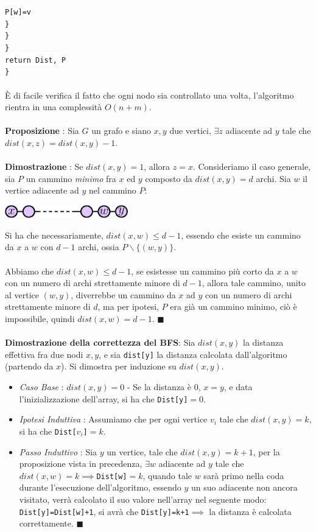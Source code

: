 \documentclass[12pt, letterpaper]{article}
\newcommand{\codee}[1]{\colorbox{white}{\texttt{#1}}}
\newcommand{\acc}{\\\hphantom{}\\}
\begin{document}
\hphantom{ident}\hphantom{ident}\hphantom{ident}\hphantom{ident}\codee{P[w]=v}\\
\hphantom{ident}\hphantom{ident}\hphantom{ident}\codee{\}}\\
\hphantom{ident}\hphantom{ident}\codee{\}}\\
\hphantom{ident}\codee{\}}\\
\hphantom{ident}\codee{return Dist, P}\\
\codee{\}}\acc
È di facile verifica il fatto che ogni nodo sia controllato una volta, l'algoritmo rientra in una complessità $O(n+m)$.\acc 
\textbf{Proposizione }: Sia $G$ un grafo e siano $x,y$ due vertici, $\exists z $ adiacente ad $y$ tale che
 $dist(x,z)=dist(x,y)-1$.\acc
 \textbf{Dimostrazione }: Se $dist(x,y)=1$, allora $z=x$. Consideriamo il caso generale, sia $P$ un cammino 
 \textit{minimo} fra $x$ ed $y$ composto da $dist(x,y)=d$ archi. Sia $w$ il vertice adiacente ad $y$ nel cammino $P$:
 \begin{center}
\includegraphics[width=0.4\textwidth ]{images/xvy.eps}
\end{center} 
Si ha che necessariamente, $dist(x,w)\le d-1$, essendo che esiste un cammino da $x$ a $w$ con $d-1$ archi, 
ossia $P\backslash \{(w,y)\}$.\acc 
Abbiamo che  $dist(x,w)\le d-1$, se esistesse un cammino più corto da $x$ a $w$ con un numero di archi strettamente 
minore di $d-1$, allora tale cammino, unito al vertice $(w,y)$, diverrebbe un cammino da $x$ ad $y$ con un numero di 
archi strettamente minore di $d$, ma per ipotesi, $P$ era già un cammino minimo, ciò è impossibile, quindi 
$dist(x,w)=d-1$. $\blacksquare$\acc
\textbf{Dimostrazione della correttezza del BFS}: Sia $dist(x,y)$ la distanza effettiva fra due nodi $x,y$, e sia 
\codee{dist[y]} la distanza calcolata dall'algoritmo (partendo da $x$). Si dimostra per induzione su $dist(x,y)$.\begin{itemize}
    \item \textit{Caso Base} : $dist(x,y)=0$ - Se la distanza è $0$, $x=y$, e data l'inizializzazione dell'array, si ha che 
    \codee{Dist[y]}$=0$. 
    \item \textit{Ipotesi Induttiva} : Assumiamo che per ogni vertice $v_i$ tale che $dist(x,y)=k$, si ha che \codee{Dist[$v_i$]}$=k$.
    \item \textit{Passo Induttivo} : Sia $y$ un vertice, tale che $dist(x,y)=k+1$, per la proposizione vista in precedenza, 
    $\exists w$ adiacente ad $y$ tale che $dist(x,w)=k\implies$\codee{Dist[w]}$=k$, quando tale $w$ sarà primo nella coda 
    durante l'esecuzione dell'algoritmo, essendo $y$ un suo adiacente non ancora visitato, verrà calcolato il suo 
    valore nell'array nel seguente modo: \codee{Dist[y]=Dist[w]+1}, si avrà che \codee{Dist[y]=k+1}$\implies$ la distanza è 
    calcolata correttamente. $\blacksquare$
\end{itemize}
\end{document}
